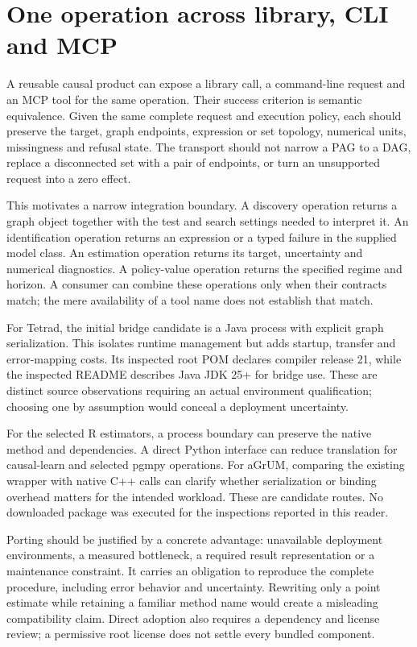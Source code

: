 \section{One operation across library, CLI and MCP}

A reusable causal product can expose a library call, a command-line request
and an MCP tool for the same operation. Their success criterion is semantic
equivalence. Given the same complete request and execution policy, each should
preserve the target, graph endpoints, expression or set topology, numerical
units, missingness and refusal state. The transport should not narrow a PAG
to a DAG, replace a disconnected set with a pair of endpoints, or turn an
unsupported request into a zero effect.

This motivates a narrow integration boundary. A discovery operation returns
a graph object together with the test and search settings needed to interpret
it. An identification operation returns an expression or a typed failure in
the supplied model class. An estimation operation returns its target,
uncertainty and numerical diagnostics. A policy-value operation returns the
specified regime and horizon. A consumer can combine these operations only
when their contracts match; the mere availability of a tool name does not
establish that match.

For Tetrad, the initial bridge candidate is a Java process with explicit graph
serialization. This isolates runtime management but adds startup, transfer
and error-mapping costs. Its inspected root POM declares compiler release 21,
while the inspected README describes Java JDK 25+ for bridge use. These are
distinct source observations requiring an actual environment qualification;
choosing one by assumption would conceal a deployment uncertainty.
\cite{v12_sw_tetrad}

For the selected R estimators, a process boundary can preserve the native
method and dependencies. A direct Python interface can reduce translation
for causal-learn and selected pgmpy operations. For aGrUM, comparing the
existing wrapper with native C++ calls can clarify whether serialization or
binding overhead matters for the intended workload. These are candidate
routes. No downloaded package was executed for the inspections reported in
this reader.

Porting should be justified by a concrete advantage: unavailable deployment
environments, a measured bottleneck, a required result representation or a
maintenance constraint. It carries an obligation to reproduce the complete
procedure, including error behavior and uncertainty. Rewriting only a point
estimate while retaining a familiar method name would create a misleading
compatibility claim. Direct adoption also requires a dependency and license
review; a permissive root license does not settle every bundled component.

